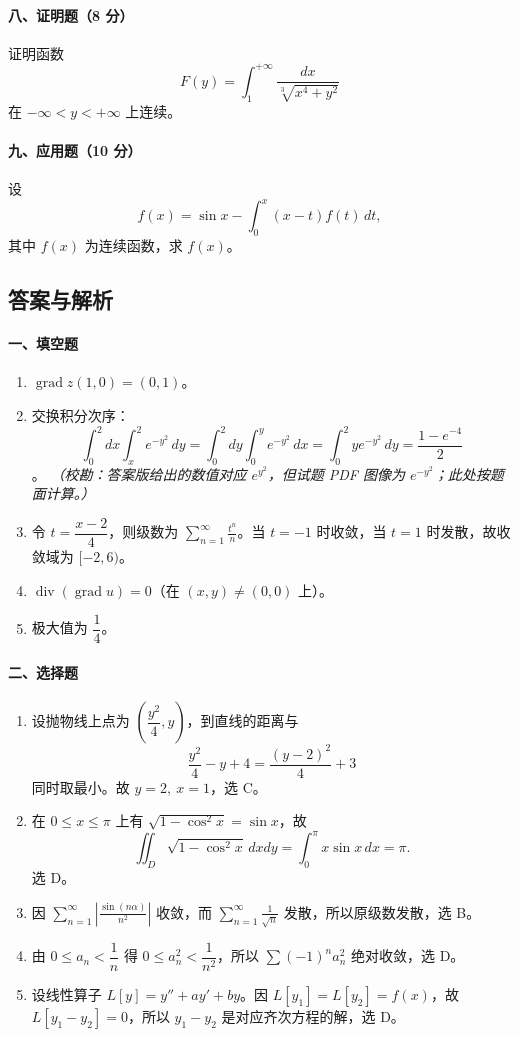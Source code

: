 \paragraph{八、证明题（8 分）}

证明函数
\[
  F(y)=\int_1^{+\infty}\frac{dx}{\sqrt[3]{x^4+y^2}}
\]
在 $-\infty<y<+\infty$ 上连续。

\paragraph{九、应用题（10 分）}

设
\[
  f(x)=\sin x-\int_0^x (x-t)f(t)\,dt,
\]
其中 $f(x)$ 为连续函数，求 $f(x)$。

\subsection{答案与解析}

\paragraph{一、填空题}

\begin{enumerate}
  \item $\operatorname{grad}z(1,0)=(0,1)$。
  \item 交换积分次序：
  \[
    \int_0^2dx\int_x^2e^{-y^2}\,dy
    =
    \int_0^2dy\int_0^y e^{-y^2}\,dx
    =
    \int_0^2ye^{-y^2}\,dy
    =
    \frac{1-e^{-4}}{2}
  \]
  。
  \textit{（校勘：答案版给出的数值对应 $e^{y^2}$，但试题 PDF 图像为 $e^{-y^2}$；此处按题面计算。）}
  \item 令 $t=\dfrac{x-2}{4}$，则级数为 $\displaystyle\sum_{n=1}^\infty \frac{t^n}{n}$。当 $t=-1$ 时收敛，当 $t=1$ 时发散，故收敛域为 $[-2,6)$。
  \item $\operatorname{div}(\operatorname{grad}u)=0$（在 $(x,y)\ne(0,0)$ 上）。
  \item 极大值为 $\dfrac14$。
\end{enumerate}

\paragraph{二、选择题}

\begin{enumerate}
  \item 设抛物线上点为 $\left(\dfrac{y^2}{4},y\right)$，到直线的距离与
  \[
    \frac{y^2}{4}-y+4=\frac{(y-2)^2}{4}+3
  \]
  同时取最小。故 $y=2,\ x=1$，选 C。
  \item 在 $0\le x\le\pi$ 上有 $\sqrt{1-\cos^2x}=\sin x$，故
  \[
    \iint_D\sqrt{1-\cos^2x}\,dxdy=\int_0^\pi x\sin x\,dx=\pi.
  \]
  选 D。
  \item 因 $\displaystyle\sum_{n=1}^\infty \left|\frac{\sin(n\alpha)}{n^2}\right|$ 收敛，而 $\displaystyle\sum_{n=1}^\infty\frac1{\sqrt n}$ 发散，所以原级数发散，选 B。
  \item 由 $0\le a_n<\dfrac1n$ 得 $0\le a_n^2<\dfrac1{n^2}$，所以 $\displaystyle\sum(-1)^na_n^2$ 绝对收敛，选 D。
  \item 设线性算子 $L[y]=y''+ay'+by$。因 $L[y_1]=L[y_2]=f(x)$，故 $L[y_1-y_2]=0$，所以 $y_1-y_2$ 是对应齐次方程的解，选 D。
\end{enumerate}

